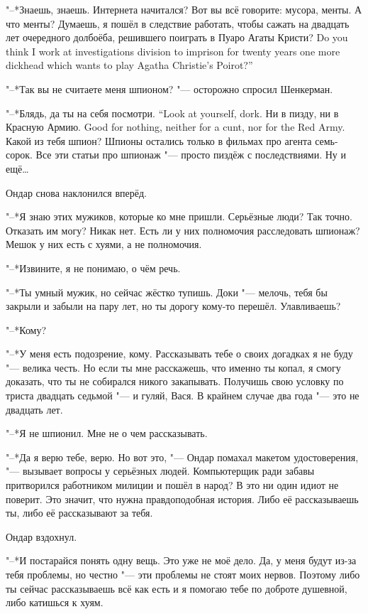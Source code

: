 "--*Знаешь, знаешь.
Интернета начитался?
Вот вы всё говорите: мусора, менты.
А что менты?
{Думаешь, я пошёл в следствие работать, чтобы сажать на двадцать лет очередного долбоёба, решившего поиграть в Пуаро Агаты Кристи?}
{Do you think I work at investigations division to imprison for twenty years one more dickhead which wants to play Agatha Christie's Poirot?''}

"--*Так вы не считаете меня шпионом? "--- осторожно спросил Шенкерман.

{"--*Блядь, да ты на себя посмотри.}
{``Look at yourself, dork.}
{Ни в пизду, ни в Красную Армию.}
{Good for nothing, neither for a cunt, nor for the Red Army.}
Какой из тебя шпион?
Шпионы остались только в фильмах про агента семь-сорок.
Все эти статьи про шпионаж "--- просто пиздёж с последствиями.
Ну и ещё\dots{}

Ондар снова наклонился вперёд.

"--*Я знаю этих мужиков, которые ко мне пришли.
Серьёзные люди?
Так точно.
Отказать им могу?
Никак нет.
Есть ли у них полномочия расследовать шпионаж?
Мешок у них есть с хуями, а не полномочия.

"--*Извините, я не понимаю, о чём речь.

"--*Ты умный мужик, но сейчас жёстко тупишь.
Доки "--- мелочь, тебя бы закрыли и забыли на пару лет, но ты дорогу кому-то перешёл.
Улавливаешь?

"--*Кому?

"--*У меня есть подозрение, кому.
Рассказывать тебе о своих догадках я не буду "--- велика честь.
Но если ты мне расскажешь, что именно ты копал, я смогу доказать, что ты не собирался никого закапывать.
Получишь свою условку по триста двадцать седьмой "--- и гуляй, Вася.
В крайнем случае два года "--- это не двадцать лет.

"--*Я не шпионил.
Мне не о чем рассказывать.

"--*Да я верю тебе, верю.
Но вот это, "--- Ондар помахал макетом удостоверения, "--- вызывает вопросы у серьёзных людей.
Компьютерщик ради забавы притворился работником милиции и пошёл в народ?
В это ни один идиот не поверит.
Это значит, что нужна правдоподобная история.
Либо её рассказываешь ты, либо её рассказывают за тебя.

Ондар вздохнул.

"--*И постарайся понять одну вещь.
Это уже не моё дело.
Да, у меня будут из-за тебя проблемы, но честно "--- эти проблемы не стоят моих нервов.
Поэтому либо ты сейчас рассказываешь всё как есть и я помогаю тебе по доброте душевной, либо катишься к хуям.

